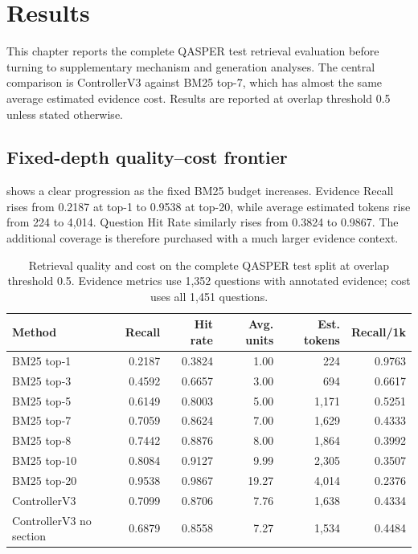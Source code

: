 \chapter{Results}
\label{chap:results}

This chapter reports the complete QASPER test retrieval evaluation before turning to supplementary mechanism and generation analyses. The central comparison is ControllerV3 against BM25 top-7, which has almost the same average estimated evidence cost. Results are reported at overlap threshold 0.5 unless stated otherwise.

\section{Fixed-depth quality--cost frontier}

 shows a clear progression as the fixed BM25 budget increases. Evidence Recall rises from 0.2187 at top-1 to 0.9538 at top-20, while average estimated tokens rise from 224 to 4,014. Question Hit Rate similarly rises from 0.3824 to 0.9867. The additional coverage is therefore purchased with a much larger evidence context.

\begin{table}[tb]
\centering
\caption{Retrieval quality and cost on the complete QASPER test split at overlap threshold 0.5. Evidence metrics use 1,352 questions with annotated evidence; cost uses all 1,451 questions.}
\label{tab:retrieval-main}
\small
\begin{tabular}{@{}lrrrrr@{}}
\toprule
Method & Recall & Hit rate & Avg. units & Est. tokens & Recall/1k \\
\midrule
BM25 top-1 & 0.2187 & 0.3824 & 1.00 & 224 & 0.9763 \\
BM25 top-3 & 0.4592 & 0.6657 & 3.00 & 694 & 0.6617 \\
BM25 top-5 & 0.6149 & 0.8003 & 5.00 & 1,171 & 0.5251 \\
BM25 top-7 & 0.7059 & 0.8624 & 7.00 & 1,629 & 0.4333 \\
BM25 top-8 & 0.7442 & 0.8876 & 8.00 & 1,864 & 0.3992 \\
BM25 top-10 & 0.8084 & 0.9127 & 9.99 & 2,305 & 0.3507 \\
BM25 top-20 & 0.9538 & 0.9867 & 19.27 & 4,014 & 0.2376 \\
\midrule
ControllerV3 & 0.7099 & 0.8706 & 7.76 & 1,638 & 0.4334 \\
ControllerV3 no section & 0.6879 & 0.8558 & 7.27 & 1,534 & 0.4484 \\
\bottomrule
\end{tabular}
\end{table}

